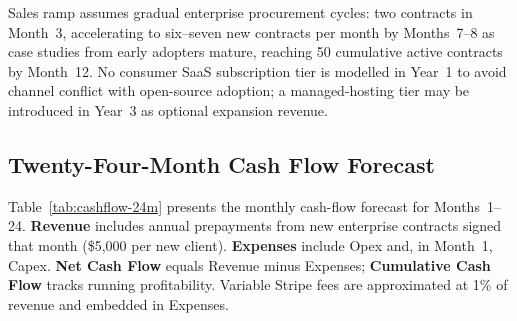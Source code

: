 Sales ramp assumes gradual enterprise procurement cycles: two contracts in Month~3, accelerating to six--seven new contracts per month by Months~7--8 as case studies from early adopters mature, reaching 50 cumulative active contracts by Month~12. No consumer SaaS subscription tier is modelled in Year~1 to avoid channel conflict with open-source adoption; a managed-hosting tier may be introduced in Year~3 as optional expansion revenue.

\subsection{Twenty-Four-Month Cash Flow Forecast}
\label{subsec:cashflow}

Table~\ref{tab:cashflow-24m} presents the monthly cash-flow forecast for Months~1--24. \textbf{Revenue} includes annual prepayments from new enterprise contracts signed that month (\$5,000 per new client). \textbf{Expenses} include Opex and, in Month~1, Capex. \textbf{Net Cash Flow} equals Revenue minus Expenses; \textbf{Cumulative Cash Flow} tracks running profitability. Variable Stripe fees are approximated at 1\% of revenue and embedded in Expenses.

